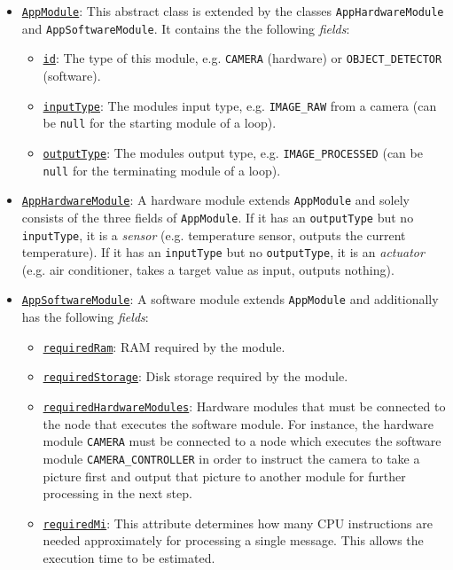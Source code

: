\begin{itemize}
    \item \underline{\texttt{AppModule}}: This abstract class is extended by the classes \texttt{AppHardwareModule} and \texttt{AppSoftwareModule}. It contains the the following \textit{fields}:
    \begin{itemize}
        \item \underline{\texttt{id}}: The type of this module, e.g. \texttt{CAMERA} (hardware) or \texttt{OBJECT\_DETECTOR} (software).
        \item \underline{\texttt{inputType}}: The modules input type, e.g. \texttt{IMAGE\_RAW} from a camera (can be \texttt{null} for the starting module of a loop).
        \item \underline{\texttt{outputType}}: The modules output type, e.g. \texttt{IMAGE\_PROCESSED} (can be \texttt{null} for the terminating module of a loop).
    \end{itemize}

    \item \underline{\texttt{AppHardwareModule}}: A hardware module extends \texttt{AppModule} and solely consists of the three fields of \texttt{AppModule}. If it has an \texttt{outputType} but no \texttt{inputType}, it is a \textit{sensor} (e.g. temperature sensor, outputs the current temperature). If it has an \texttt{inputType} but no \texttt{outputType}, it is an \textit{actuator} (e.g. air conditioner, takes a target value as input, outputs nothing).
    
    \item \underline{\texttt{AppSoftwareModule}}: A software module extends \texttt{AppModule} and additionally has the following \textit{fields}:
    \begin{itemize}
        \item \underline{\texttt{requiredRam}}: RAM required by the module.
        \item \underline{\texttt{requiredStorage}}: Disk storage required by the module.
        \item \underline{\texttt{requiredHardwareModules}}: Hardware modules that must be connected to the node that executes the software module. For instance, the hardware module \texttt{CAMERA} must be connected to a node which executes the software module \texttt{CAMERA\_CONTROLLER} in order to instruct the camera to take a picture first and output that picture to another module for further processing in the next step.
        \item \underline{\texttt{requiredMi}}: This attribute determines how many CPU instructions are needed approximately for processing a single message. This allows the execution time to be estimated.
    \end{itemize}
    

\end{itemize}
